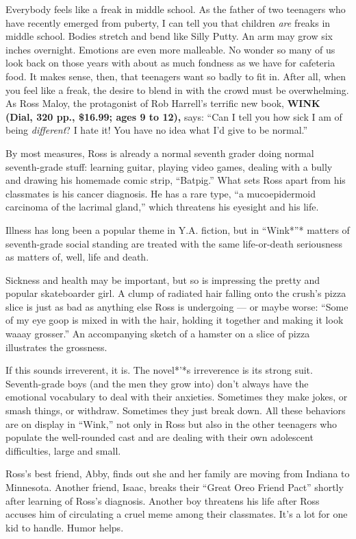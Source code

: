Everybody feels like a freak in middle school. As the father of two
teenagers who have recently emerged from puberty, I can tell you that
children \emph{are} freaks in middle school. Bodies stretch and bend
like Silly Putty. An arm may grow six inches overnight. Emotions are
even more malleable. No wonder so many of us look back on those years
with about as much fondness as we have for cafeteria food. It makes
sense, then, that teenagers want so badly to fit in. After all, when you
feel like a freak, the desire to blend in with the crowd must be
overwhelming. As Ross Maloy, the protagonist of Rob Harrell's terrific
new book, \textbf{WINK (Dial, 320 pp., \$16.99; ages 9 to 12),} says:
``Can I tell you how sick I am of being \emph{different}? I hate it! You
have no idea what I'd give to be normal.''

By most measures, Ross is already a normal seventh grader doing normal
seventh-grade stuff: learning guitar, playing video games, dealing with
a bully and drawing his homemade comic strip, ``Batpig.'' What sets Ross
apart from his classmates is his cancer diagnosis. He has a rare type,
``a mucoepidermoid carcinoma of the lacrimal gland,'' which threatens
his eyesight and his life.

Illness has long been a popular theme in Y.A. fiction, but in ``Wink*''*
matters of seventh-grade social standing are treated with the same
life-or-death seriousness as matters of, well, life and death.

Sickness and health may be important, but so is impressing the pretty
and popular skateboarder girl. A clump of radiated hair falling onto the
crush's pizza slice is just as bad as anything else Ross is undergoing
--- or maybe worse: ``Some of my eye goop is mixed in with the hair,
holding it together and making it look waaay grosser.'' An accompanying
sketch of a hamster on a slice of pizza illustrates the grossness.

If this sounds irreverent, it is. The novel*'*s irreverence is its
strong suit. Seventh-grade boys (and the men they grow into) don't
always have the emotional vocabulary to deal with their anxieties.
Sometimes they make jokes, or smash things, or withdraw. Sometimes they
just break down. All these behaviors are on display in ``Wink,'' not
only in Ross but also in the other teenagers who populate the
well-rounded cast and are dealing with their own adolescent
difficulties, large and small.

Ross's best friend, Abby, finds out she and her family are moving from
Indiana to Minnesota. Another friend, Isaac, breaks their ``Great Oreo
Friend Pact'' shortly after learning of Ross's diagnosis. Another boy
threatens his life after Ross accuses him of circulating a cruel meme
among their classmates. It's a lot for one kid to handle. Humor helps.

